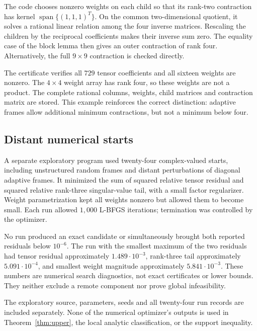 \documentclass[11pt]{article}
\theoremstyle{definition}\newtheorem{definition}[theorem]{Definition}
\begin{document}
The code chooses nonzero weights on each child so that its rank-two contraction has kernel $\operatorname{span}\{(1,1,1)^T\}$. On the common two-dimensional quotient, it solves a rational linear relation among the four inverse matrices. Rescaling the children by the reciprocal coefficients makes their inverse sum zero. The equality case of the block lemma then gives an outer contraction of rank four. Alternatively, the full $9\times9$ contraction is checked directly.

The certificate verifies all $729$ tensor coefficients and all sixteen weights are nonzero. The $4\times4$ weight array has rank four, so these weights are not a product. The complete rational columns, weights, child matrices and contraction matrix are stored. This example reinforces the correct distinction: adaptive frames allow additional minimum contractions, but not a minimum below four.

\subsection{Distant numerical starts}
A separate exploratory program used twenty-four complex-valued starts, including unstructured random frames and distant perturbations of diagonal adaptive frames. It minimized the sum of squared relative tensor residual and squared relative rank-three singular-value tail, with a small factor regularizer. Weight parametrization kept all weights nonzero but allowed them to become small. Each run allowed $1,000$ L-BFGS iterations; termination was controlled by the optimizer.

No run produced an exact candidate or simultaneously brought both reported residuals below $10^{-6}$. The run with the smallest maximum of the two residuals had tensor residual approximately $1.489\cdot10^{-3}$, rank-three tail approximately $5.091\cdot10^{-4}$, and smallest weight magnitude approximately $5.841\cdot10^{-3}$. These numbers are numerical search diagnostics, not exact certificates or lower bounds. They neither exclude a remote component nor prove global infeasibility.

The exploratory source, parameters, seeds and all twenty-four run records are included separately. None of the numerical optimizer's outputs is used in Theorem~\ref{thm:upper}, the local analytic classification, or the support inequality.
\end{document}
